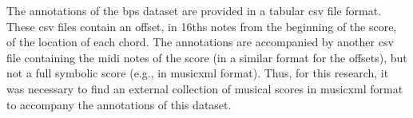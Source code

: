 

The annotations of the \gls{bps} dataset are provided in a
tabular \gls{csv} file format. These \gls{csv} files contain
an offset, in \glspl{16th} notes from the beginning of the
score, of the location of each chord. The annotations are
accompanied by another \gls{csv} file containing the
\gls{midi} notes of the score (in a similar format for the
offsets), but not a full symbolic score (e.g., in
\gls{musicxml} format). Thus, for this research, it was
necessary to find an external collection of musical scores
in \gls{musicxml} format to accompany the annotations of
this dataset.

